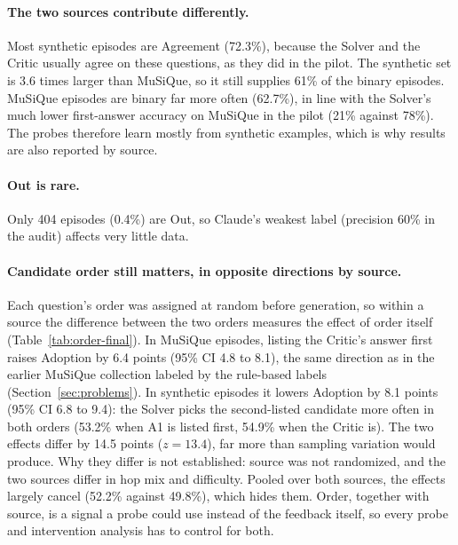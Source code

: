 \paragraph{The two sources contribute differently.} Most synthetic episodes
are Agreement (72.3\%), because the Solver and the Critic usually agree on
these questions, as they did in the pilot. The synthetic set is 3.6 times
larger than MuSiQue, so it still supplies 61\% of the binary episodes. MuSiQue
episodes are binary far more often (62.7\%), in line with the Solver's much
lower first-answer accuracy on MuSiQue in the pilot (21\% against 78\%). The
probes therefore learn mostly from synthetic examples, which is why results
are also reported by source.

\paragraph{Out is rare.} Only 404 episodes (0.4\%) are Out, so Claude's weakest
label (precision 60\% in the audit) affects very little data.

\paragraph{Candidate order still matters, in opposite directions by source.}
Each question's order was assigned at random before generation, so within a
source the difference between the two orders measures the effect of order
itself (Table~\ref{tab:order-final}). In MuSiQue episodes, listing the
Critic's answer first raises Adoption by 6.4 points (95\% CI 4.8 to 8.1),
the same direction as in the earlier MuSiQue collection labeled by the
rule-based labels (Section~\ref{sec:problems}). In synthetic episodes it
lowers Adoption by 8.1 points (95\% CI 6.8 to 9.4): the Solver picks the
second-listed candidate more often in both orders (53.2\% when A1 is listed
first, 54.9\% when the Critic is). The two effects differ by 14.5 points
($z = 13.4$), far more than sampling variation would produce. Why they differ
is not established: source was not randomized, and the two sources differ in
hop mix and difficulty. Pooled over both sources, the effects largely cancel
(52.2\% against 49.8\%), which hides them. Order, together with source, is a
signal a probe could use instead of the feedback itself, so every probe and
intervention analysis has to control for both.

